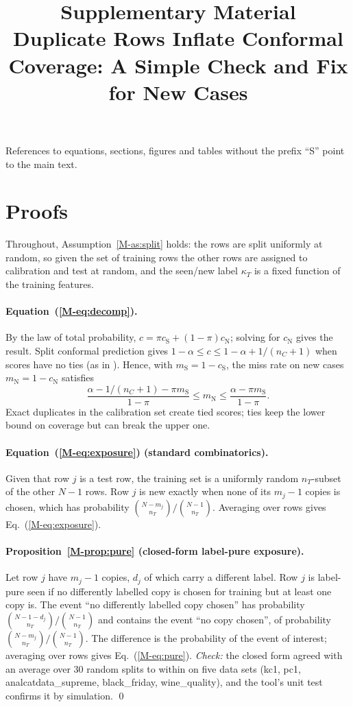 \documentclass[11pt]{article}
\title{Supplementary Material\\[4pt]\large Duplicate Rows Inflate Conformal Coverage: A Simple Check and Fix for New Cases}
\date{}
\begin{document}
\maketitle
\noindent References to equations, sections, figures and tables without the prefix ``S'' point to the main text.
\tableofcontents

\section{Proofs}\label{sec:proofs}
Throughout, Assumption~\ref{M-as:split} holds: the rows are split uniformly at random, so given the set of training rows the other rows are assigned to calibration and test at random, and the seen/new label $\kappa_T$ is a fixed function of the training features.

\paragraph{Equation~(\ref{M-eq:decomp}).} By the law of total probability, $c=\pi c_{\mathrm S}+(1-\pi)c_{\mathrm N}$; solving for $c_{\mathrm N}$ gives the result. Split conformal prediction gives $1-\alpha\le c\le 1-\alpha+1/(n_C+1)$ when scores have no ties (as in \cite{M-lei2018}). Hence, with $m_{\mathrm S}=1-c_{\mathrm S}$, the miss rate on new cases $m_{\mathrm N}=1-c_{\mathrm N}$ satisfies
\begin{equation}
\frac{\alpha-1/(n_C+1)-\pi m_{\mathrm S}}{1-\pi}\le m_{\mathrm N}\le \frac{\alpha-\pi m_{\mathrm S}}{1-\pi}.
\end{equation}
Exact duplicates in the calibration set create tied scores; ties keep the lower bound on coverage but can break the upper one.

\paragraph{Equation~(\ref{M-eq:exposure}) (standard combinatorics).} Given that row $j$ is a test row, the training set is a uniformly random $n_T$-subset of the other $N-1$ rows. Row $j$ is new exactly when none of its $m_j-1$ copies is chosen, which has probability $\binom{N-m_j}{n_T}/\binom{N-1}{n_T}$. Averaging over rows gives Eq.~(\ref{M-eq:exposure}).

\paragraph{Proposition~\ref{M-prop:pure} (closed-form label-pure exposure).} Let row $j$ have $m_j-1$ copies, $d_j$ of which carry a different label. Row $j$ is label-pure seen if no differently labelled copy is chosen for training but at least one copy is. The event ``no differently labelled copy chosen'' has probability $\binom{N-1-d_j}{n_T}/\binom{N-1}{n_T}$ and contains the event ``no copy chosen'', of probability $\binom{N-m_j}{n_T}/\binom{N-1}{n_T}$. The difference is the probability of the event of interest; averaging over rows gives Eq.~(\ref{M-eq:pure}). \emph{Check:} the closed form agreed with an average over 30 random splits to within \NPureCfMaxdiff{} on five data sets (kc1, pc1, analcatdata\_supreme, black\_friday, wine\_quality), and the tool's unit test confirms it by simulation. \qed
\end{document}
